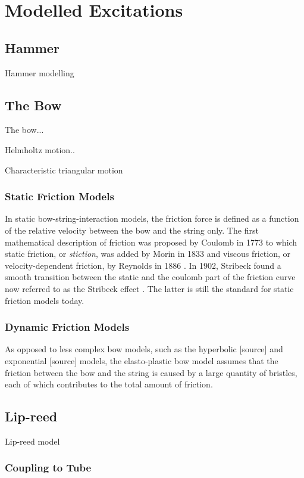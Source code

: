 \chapter{Modelled Excitations}\label{ch:bowModels}

\section{Hammer}
Hammer modelling

\section{The Bow}
The bow...

Helmholtz motion..

Characteristic triangular motion

\subsection{Static Friction Models}
In static bow-string-interaction models, the friction force is defined as a function of the relative velocity between the bow and the string only.
The first mathematical description of friction was proposed by Coulomb in 1773 \cite{Coulomb} to which static friction, or \textit{stiction}, was added by Morin in 1833 \cite{Morin1833} and viscous friction, or velocity-dependent friction, by Reynolds in 1886 \cite{Reynolds1886}. In 1902, Stribeck found a smooth transition between the static and the coulomb part of the friction curve now referred to as the Stribeck effect \cite{Stribeck1902}. The latter is still the standard for static friction models today.

\subsection{Dynamic Friction Models}
As opposed to less complex bow models, such as the hyperbolic [source] and exponential [source] models, the elasto-plastic bow model assumes that the friction between the bow and the string is caused by a large quantity of bristles, each of which contributes to the total amount of friction.

\section{Lip-reed}
Lip-reed model


\subsection{Coupling to Tube}